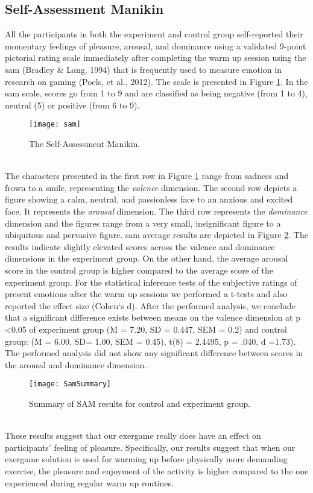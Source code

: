 \subsection{Self-Assessment Manikin}
All the participants in both the experiment and control group self-reported their momentary feelings of pleasure, arousal, and dominance using a validated 9-point pictorial rating scale immediately after completing the warm up session using the \acrfull{sam} (Bradley \& Lang, 1994) that  is frequently used to measure emotion in research on gaming (Poels, et al., 2012). The scale is  presented in Figure \ref{fig:samoverview}. In the \acrshort{sam} scale, scores go from 1 to 9 and are classified as being negative (from 1 to 4), neutral (5) or positive (from 6 to 9).\\
\begin{figure}[h]
    \centering
    \texttt{[image: sam]}
    \caption{The Self-Assessment Manikin.}
    \label{fig:samoverview}
\end{figure}\\
The characters presented in the first row in Figure \ref{fig:samoverview} range from sadness and frown to
a smile, representing the \textit{valence} dimension. The second row depicts a figure showing a calm, neutral, and passionless face to an anxious and excited face. It represents the \textit{arousal} dimension. The third row represents the \textit{dominance} dimension and the figures range from a very small, insignificant figure to a ubiquitous and pervasive figure. \acrshort{sam} average  results are depicted in Figure \ref{fig:sam}. The results  indicate slightly elevated scores across the valence and dominance
dimensions in the experiment group. On the other hand, the average arousal score in the control group is higher compared to the average score of the experiment group. 
For the statistical inference tests of the subjective ratings of present emotions after the warm up sessions we performed a t-tests and also reported the effect size (Cohen`s d). After the performed analysis, we conclude that a significant difference exists between means on the valence dimension at p \textless  0.05 of experiment group (M = 7.20, SD = 0.447, SEM = 0.2) and control group: (M = 6.00, SD= 1.00, SEM = 0.45), t(8) = 2.4495, p = .040, d =1.73).  The performed analysis did not show any significant difference between scores in the arousal and dominance dimension.\\
\begin{figure}[h]
    \centering
    \texttt{[image: SamSummary]}
    \caption{Summary of SAM results for control and experiment group.}
    \label{fig:sam}
\end{figure}\\
These results suggest that our exergame really does have an effect on participants' feeling of pleasure. Specifically, our results suggest that when our exergame solution is used for warming up before physically more demanding exercise, the pleasure and enjoyment of the activity is higher compared to the one experienced during regular warm up routines. 

